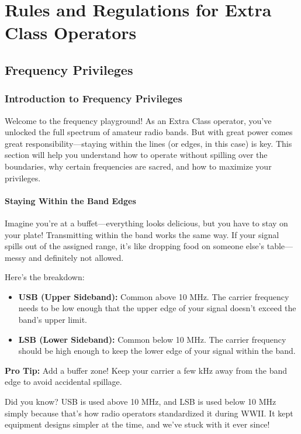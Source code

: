 \chapter{Rules and Regulations for Extra Class Operators}

\section{Frequency Privileges}

\subsection*{Introduction to Frequency Privileges}
Welcome to the frequency playground! As an Extra Class operator, you’ve unlocked the full spectrum of amateur radio bands. But with great power comes great responsibility—staying within the lines (or edges, in this case) is key. This section will help you understand how to operate without spilling over the boundaries, why certain frequencies are sacred, and how to maximize your privileges.

\subsubsection*{Staying Within the Band Edges}
Imagine you’re at a buffet—everything looks delicious, but you have to stay on your plate! Transmitting within the band works the same way. If your signal spills out of the assigned range, it’s like dropping food on someone else’s table—messy and definitely not allowed.

Here’s the breakdown:
\begin{itemize}
    \item \textbf{USB (Upper Sideband):} Common above 10 MHz. The carrier frequency needs to be low enough that the upper edge of your signal doesn’t exceed the band’s upper limit.
    \item \textbf{LSB (Lower Sideband):} Common below 10 MHz. The carrier frequency should be high enough to keep the lower edge of your signal within the band.
\end{itemize}

\textbf{Pro Tip:} Add a buffer zone! Keep your carrier a few kHz away from the band edge to avoid accidental spillage.

\begin{tcolorbox}[title=Fun Fact: Why USB and LSB?]
Did you know? USB is used above 10 MHz, and LSB is used below 10 MHz simply because that’s how radio operators standardized it during WWII. It kept equipment designs simpler at the time, and we’ve stuck with it ever since!
\end{tcolorbox}

